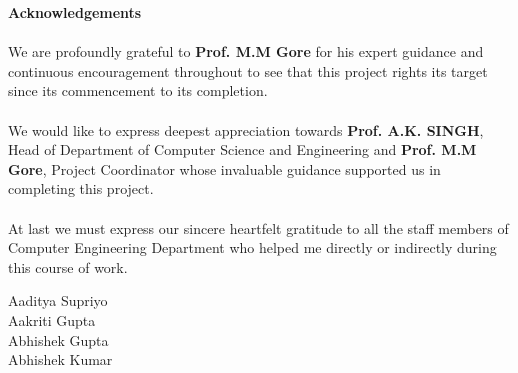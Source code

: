 \begin{center}
\thispagestyle{empty}
\LARGE{\textbf{Acknowledgements}}\\[1cm]
\end{center}
\linespread{1.13}
\large{\paragraph{}We are profoundly grateful to \textbf{Prof. M.M Gore } for his expert guidance
and continuous encouragement throughout to see that this project rights its
target since its commencement to its completion.}
\large{\paragraph{}We would like to express deepest appreciation towards \textbf{Prof. A.K. SINGH}, 
Head of Department of Computer Science and  Engineering and \textbf{Prof. M.M Gore}, Project Coordinator whose
invaluable guidance supported us in completing this project.}
\large{\paragraph{}At last we must express our sincere heartfelt gratitude to all the staff members
of Computer Engineering Department who helped me directly or indirectly during this course of work.}
\begin{flushright}
{
Aaditya Supriyo\\
Aakriti Gupta\\
Abhishek Gupta\\
Abhishek Kumar
}
\end{flushright}
\newpage

